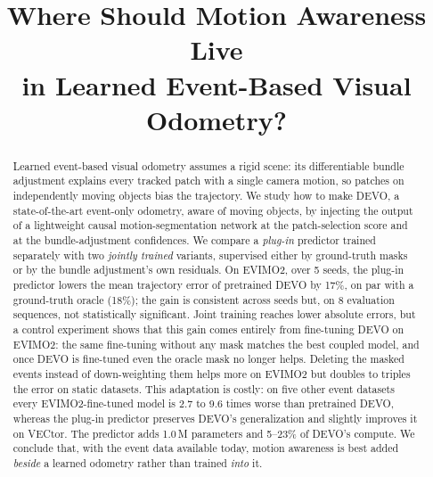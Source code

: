 \documentclass[conference]{IEEEtran}
\begin{document}
\title{Where Should Motion Awareness Live\\in Learned Event-Based Visual Odometry?}

\author{
}

\maketitle

\begin{abstract}
Learned event-based visual odometry assumes a rigid scene: its differentiable bundle
adjustment explains every tracked patch with a single camera motion, so patches on
independently moving objects bias the trajectory. We study how to make DEVO, a
state-of-the-art event-only odometry, aware of moving objects, by injecting the output of a
lightweight causal motion-segmentation network at the patch-selection score and at the
bundle-adjustment confidences. We compare a \emph{plug-in} predictor trained separately
with two \emph{jointly trained} variants, supervised either by ground-truth masks or by the
bundle adjustment's own residuals. On EVIMO2, over 5 seeds, the plug-in predictor lowers
the mean trajectory error of pretrained DEVO by 17\%, on par with a ground-truth oracle
(18\%); the gain is consistent across seeds but, on 8 evaluation sequences, not
statistically significant. Joint training reaches lower absolute errors, but a control
experiment shows that this gain comes entirely from fine-tuning DEVO on EVIMO2: the same
fine-tuning without any mask matches the best coupled model, and once DEVO is fine-tuned
even the oracle mask no longer helps. Deleting the masked events instead of
down-weighting them helps more on EVIMO2 but doubles to triples the error on static
datasets. This adaptation is costly: on five other event datasets every
EVIMO2-fine-tuned model is 2.7 to 9.6 times worse than pretrained DEVO, whereas the
plug-in predictor preserves DEVO's generalization and slightly improves it on VECtor. The
predictor adds 1.0\,M parameters and 5--23\% of DEVO's compute. We conclude that, with the
event data available today, motion awareness is best added \emph{beside} a learned odometry
rather than trained \emph{into} it.
\end{abstract}
\end{document}

